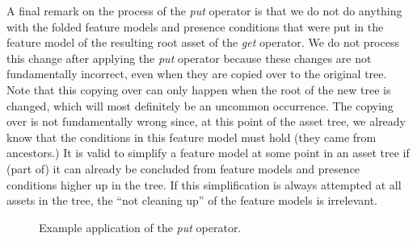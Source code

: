 A final remark on the process of the \emph{put} operator is that we do not do
anything with the folded feature models and presence conditions that were put
in the feature model of the resulting root asset of the \emph{get} operator.
We do not process this change after applying the \emph{put} operator because
these changes are not fundamentally incorrect, even when they are copied over
to the original tree. Note that this copying over can only happen when the root
of the new tree is changed, which will most definitely be an uncommon occurrence.
The copying over is not fundamentally wrong since, at this point of the asset
tree, we already know that the conditions in this feature model must hold (they
came from ancestors.) It is valid to simplify a feature model at some point in
an asset tree if (part of) it can already be concluded from feature models and
presence conditions higher up in the tree. If this simplification is always
attempted at all assets in the tree, the ``not cleaning up'' of the feature
models is irrelevant.

\begin{figure}
  \centering
  \caption{Example application of the \emph{put} operator.}
  \label{fig:example:put}
\end{figure}

